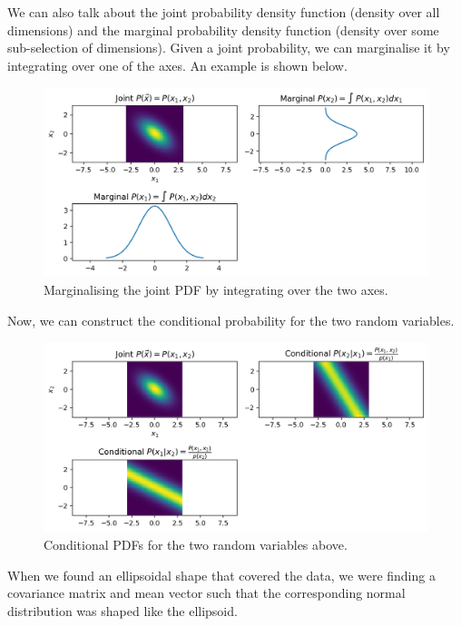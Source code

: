 \documentclass[a4paper, openany]{memoir}
\begin{document}
\noindent We can also talk about the joint probability density function (density over all dimensions) and the marginal probability density function (density over some sub-selection of dimensions). Given a joint probability, we can marginalise it by integrating over one of the axes. An example is shown below.
\begin{figure}[H]
    \centering
    \includegraphics[scale=0.5]{src/5.23 joint and marginal pdf.png}
    \caption{Marginalising the joint PDF by integrating over the two axes.}
\end{figure}
\noindent Now, we can construct the conditional probability for the two random variables.
\begin{figure}[H]
    \centering
    \includegraphics[scale=0.5]{src/5.24 joint and conditional.png}
    \caption{Conditional PDFs for the two random variables above.}
\end{figure}
\noindent When we found an ellipsoidal shape that covered the data, we were finding a covariance matrix and mean vector such that the corresponding normal distribution was shaped like the ellipsoid.

\end{document}
